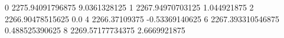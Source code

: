 0 2275.94091796875 9.0361328125
1 2267.94970703125 1.044921875
2 2266.90478515625 0.0
4 2266.37109375 -0.53369140625
6 2267.393310546875 0.488525390625
8 2269.57177734375 2.6669921875
